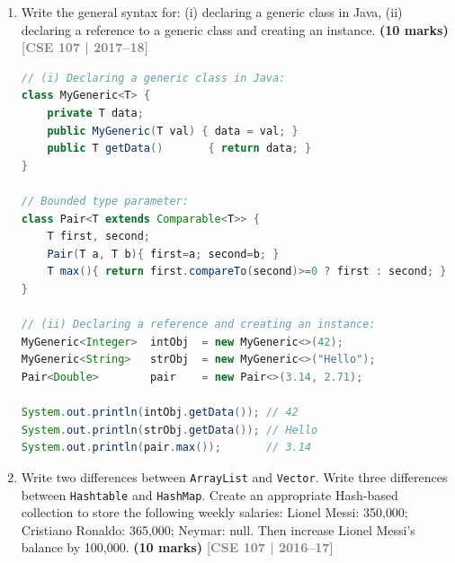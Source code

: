 \documentclass[12pt,a3paper]{article}
\newcommand{\yr}[1]{\hfill\textcolor{gray}{\small\textbf{[#1]}}}
\newcommand{\mk}[1]{\textcolor{orange!70!black}{\small\textbf{(#1 marks)}}}
\begin{document}
\begin{enumerate}
\begin{tcolorbox}[enhanced,breakable,ansbox,
  colback=cG!4,colframe=cG,boxrule=0.8pt,arc=5pt,
  title={\textbf{Answer --- Cricketer Salaries with HashMap}},
  fonttitle=\bfseries\color{white},colbacktitle=cG]
\begin{lstlisting}[language=Java]
        System.out.println("\nSakib after raise: "
                           + salaries.get("Sakib Al Hasan"));
    }
}
\end{lstlisting}
\textbf{Output:}
\begin{verbatim}
--- Monthly Salaries ---
Sakib Al Hasan: 300000
Mashrafe Bin Mortaza: null
Mushfiqur Rahim: 250000

Sakib after raise: 350000
\end{verbatim}
\end{tcolorbox}



\item Write the general syntax for: (i) declaring a generic class in Java, (ii) declaring a reference to a generic class and creating an instance. \mk{10}
\yr{CSE 107 | 2017--18}
\begin{tcolorbox}[enhanced,breakable,ansbox,colback=cG!4,colframe=cG,
  boxrule=0.8pt,arc=5pt,
  title={\textbf{Answer --- Java generic class syntax}},
  fonttitle=\bfseries\color{white},colbacktitle=cG]

\begin{lstlisting}[language=Java]
// (i) Declaring a generic class in Java:
class MyGeneric<T> {
    private T data;
    public MyGeneric(T val) { data = val; }
    public T getData()       { return data; }
}

// Bounded type parameter:
class Pair<T extends Comparable<T>> {
    T first, second;
    Pair(T a, T b){ first=a; second=b; }
    T max(){ return first.compareTo(second)>=0 ? first : second; }
}

// (ii) Declaring a reference and creating an instance:
MyGeneric<Integer>  intObj  = new MyGeneric<>(42);
MyGeneric<String>   strObj  = new MyGeneric<>("Hello");
Pair<Double>        pair    = new Pair<>(3.14, 2.71);

System.out.println(intObj.getData()); // 42
System.out.println(strObj.getData()); // Hello
System.out.println(pair.max());       // 3.14
\end{lstlisting}

\end{tcolorbox}


\item Write two differences between \texttt{ArrayList} and \texttt{Vector}. Write three differences between \texttt{Hashtable} and \texttt{HashMap}. Create an appropriate Hash-based collection to store the following weekly salaries: Lionel Messi: 350{,}000; Cristiano Ronaldo: 365{,}000; Neymar: null. Then increase Lionel Messi's balance by 100{,}000. \mk{10}
\yr{CSE 107 | 2016--17}


\end{enumerate}
\end{document}
